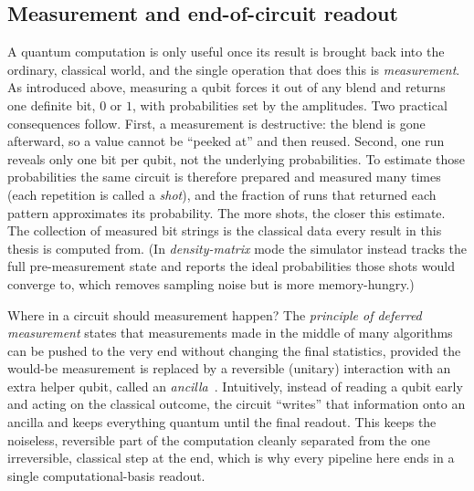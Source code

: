 \subsection{Measurement and end-of-circuit readout}
A quantum computation is only useful once its result is brought back into the ordinary, classical world, and the single operation that does this is \emph{measurement}. As introduced above, measuring a qubit forces it out of any blend and returns one definite bit, $0$ or $1$, with probabilities set by the amplitudes. Two practical consequences follow. First, a measurement is destructive: the blend is gone afterward, so a value cannot be ``peeked at'' and then reused. Second, one run reveals only one bit per qubit, not the underlying probabilities. To estimate those probabilities the same circuit is therefore prepared and measured many times (each repetition is called a \emph{shot}), and the fraction of runs that returned each pattern approximates its probability. The more shots, the closer this estimate. The collection of measured bit strings is the classical data every result in this thesis is computed from. (In \emph{density-matrix} mode the simulator instead tracks the full pre-measurement state and reports the ideal probabilities those shots would converge to, which removes sampling noise but is more memory-hungry.)

Where in a circuit should measurement happen? The \emph{principle of deferred measurement} states that measurements made in the middle of many algorithms can be pushed to the very end without changing the final statistics, provided the would-be measurement is replaced by a reversible (unitary) interaction with an extra helper qubit, called an \emph{ancilla}~\cite{NielsenChuang2010}. Intuitively, instead of reading a qubit early and acting on the classical outcome, the circuit ``writes'' that information onto an ancilla and keeps everything quantum until the final readout. This keeps the noiseless, reversible part of the computation cleanly separated from the one irreversible, classical step at the end, which is why every pipeline here ends in a single computational-basis readout.

